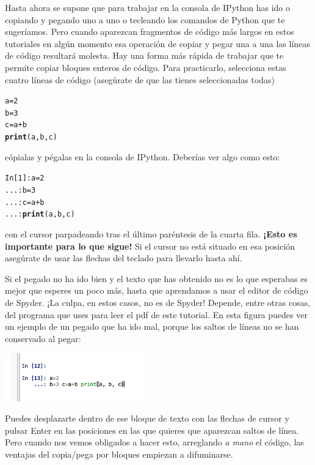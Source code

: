 \documentclass[10pt,a4paper]{article}\usepackage[]{graphicx}\usepackage[]{color}
\makeatletter
\newcommand{\hlnum}[1]{\textcolor[rgb]{0.686,0.059,0.569}{#1}}%
\newcommand{\hlopt}[1]{\textcolor[rgb]{0,0,0}{#1}}%
\newcommand{\hlstd}[1]{\textcolor[rgb]{0.345,0.345,0.345}{#1}}%
\newcommand{\hlkwb}[1]{\textcolor[rgb]{0.69,0.353,0.396}{#1}}%
\newcommand{\hlkwd}[1]{\textcolor[rgb]{0.737,0.353,0.396}{\textbf{#1}}}%
\newenvironment{kframe}{%
 \def\at@end@of@kframe{}%
 \ifinner\ifhmode%
  \def\at@end@of@kframe{\end{minipage}}%
  \begin{minipage}{\columnwidth}%
 \fi\fi%
 \def\FrameCommand##1{\hskip\@totalleftmargin \hskip-\fboxsep
 \colorbox{shadecolor}{##1}\hskip-\fboxsep
     \hskip-\linewidth \hskip-\@totalleftmargin \hskip\columnwidth}%
 \MakeFramed {\advance\hsize-\width
   \@totalleftmargin\z@ \linewidth\hsize
   \@setminipage}}%
 {\par\unskip\endMakeFramed%
 \at@end@of@kframe}
\newenvironment{knitrout}{}{} %
\makeatother
\begin{document}
Hasta ahora se supone que para trabajar en la consola de IPython has ido o copiando y pegando uno a uno o tecleando los comandos de Python que te sugeríamos. Pero cuando aparezcan fragmentos de código más largos en estos tutoriales en algún momento esa operación de copiar y pegar una a una las líneas de código resultará molesta. Hay una forma más rápida de trabajar que te permite copiar bloques enteros de código. Para practicarlo, selecciona estas cuatro líneas de código (asegúrate de que las tienes seleccionadas todas)
\begin{knitrout}
\color{fgcolor}\begin{kframe}
\begin{alltt}
\hlstd{a} \hlkwb{=} \hlnum{2}
\hlstd{b} \hlkwb{=} \hlnum{3}
\hlstd{c} \hlkwb{=} \hlstd{a} \hlopt{+} \hlstd{b}
\hlkwd{print}\hlstd{(a, b, c)}
\end{alltt}
\end{kframe}
\end{knitrout}
cópialas y pégalas en la consola de IPython. Deberías ver algo como esto:
\begin{knitrout}
\color{fgcolor}\begin{kframe}
\begin{alltt}
\hlstd{In [}\hlnum{1}\hlstd{]}\hlopt{:} \hlstd{a} \hlkwb{=} \hlnum{2}
   \hlstd{...}\hlopt{:} \hlstd{b} \hlkwb{=} \hlnum{3}
   \hlstd{...}\hlopt{:} \hlstd{c} \hlkwb{=} \hlstd{a} \hlopt{+} \hlstd{b}
   \hlstd{...}\hlopt{:} \hlkwd{print}\hlstd{(a, b, c)}
\end{alltt}
\end{kframe}
\end{knitrout}
con el cursor parpadeando tras el último paréntesis de la cuarta fila. {\bf ¡Esto es importante para lo que sigue!} Si el cursor no está situado en esa posición asegúrate de usar las flechas del teclado para llevarlo hasta ahí. 

Si el pegado no ha ido bien y el texto que has obtenido no es lo que esperabas es mejor que esperes un poco más, hasta que aprendamos a usar el editor de código de Spyder. ¡La culpa, en estos casos, no es de Spyder! Depende, entre otras cosas, del programa que uses para leer el pdf de este tutorial. En esta figura puedes ver un ejemplo de un pegado que ha ido mal, porque los saltos de líneas no se han conservado al pegar:
\begin{center}
\includegraphics[width=6cm]{../fig/Tut-02-py-22-BloqueCodigoMalPegado.png}
\end{center}
Puedes desplazarte dentro de ese bloque de texto con las flechas de cursor y pulsar Enter en las posiciones en las que quieres que aparezcan saltos de línea. Pero cuando nos vemos obligados a hacer esto, arreglando {\em a mano} el código, las ventajas del copia/pega por bloques empiezan a difuminarse. 
\end{document}
